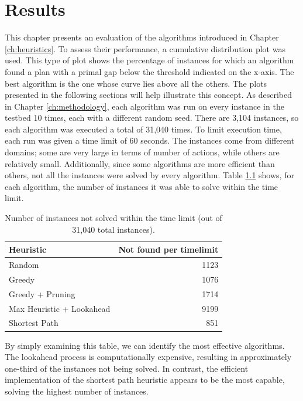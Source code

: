 \chapter{Results}
\label{ch:results}
This chapter presents an evaluation of the algorithms introduced in Chapter \ref{ch:heuristics}.
To assess their performance, a cumulative distribution plot was used.
This type of plot shows the percentage of instances for which an algorithm found a plan with a
primal gap below the threshold indicated on the x-axis.
The best algorithm is the one whose curve lies above all the others.
The plots presented in the following sections will help illustrate this concept.
As described in Chapter \ref{ch:methodology}, each algorithm was run on every instance in the
testbed 10 times, each with a different random seed.
There are 3,104 instances, so each algorithm was executed a total of 31,040 times.
To limit execution time, each run was given a time limit of 60 seconds. The instances
come from different domains; some are very large in terms of number of actions, while others are
relatively small.
Additionally, since some algorithms are more efficient than others, not all the instances
were solved by every algorithm. Table \ref{tab:timelimit} shows, for each algorithm,
the number of instances it was able to solve within the time limit.

\begin{table}[h!]
	\centering
	\begin{tabular}{|l|r|}
		\hline
		\textbf{Heuristic}        & \textbf{Not found per timelimit} \\
		\hline
		Random                    & 1123                             \\
		Greedy                    & 1076                             \\
		Greedy + Pruning          & 1714                             \\
		Max Heuristic + Lookahead & 9199                             \\
		Shortest Path             & 851                              \\
		\hline
	\end{tabular}
	\caption{Number of instances not solved within the time limit (out of 31,040 total instances).}
	\label{tab:timelimit}
\end{table}

By simply examining this table, we can identify the most effective algorithms.
The lookahead process is computationally expensive, resulting in approximately one-third of the instances not being solved.
In contrast, the efficient implementation of the shortest path heuristic appears to be the most capable,
solving the highest number of instances.

